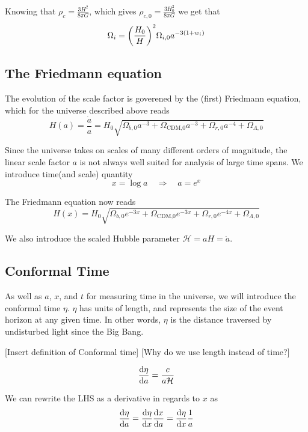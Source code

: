 \documentclass[a4paper]{article}
\renewcommand{\exp}{e^}
\renewcommand{\exp}{e^}
\begin{document}
Knowing that $\rho_c = \frac{3H^2}{8\pi G}$, which gives $\rho_{c,0} = \frac{3H_0^2}{8\pi G}$ we get that
\begin{align*}
    \Omega_{i} = \qty(\frac{H_0}{H})^2\Omega_{i,0}a^{-3(1+w_i)}
\end{align*}


\subsection{The Friedmann equation}
The evolution of the scale factor is goverened by the (first) Friedmann equation, which for the universe described above reads
\begin{equation}
    H(a) = \frac{\dot{a}}{a} = H_0\sqrt{\Omega_{b,0} a^{-3} + \Omega_\text{{CDM},0}a^{-3} + \Omega_{r,0}a^{-4} + \Omega_{\Lambda,0}}
\end{equation}

Since the universe takes on scales of many different orders of magnitude, the linear scale factor $a$ is not always well suited for analysis of large time spans. We introduce time(and scale) quantity
\begin{equation}
    x = \log{a} \quad \Rightarrow \quad a = \exp{x}
\end{equation}

The Friedmann equation now reads
\begin{equation}
    H(x) = H_0\sqrt{\Omega_{b,0} e^{-3x} + \Omega_\text{{CDM},0}e^{-3x} + \Omega_{r,0}e^{-4x} + \Omega_{\Lambda,0}}
\end{equation}

We also introduce the scaled Hubble parameter $\mathcal{H} = aH = \dot{a}$.


\subsection{Conformal Time}
As well as $a$, $x$, and $t$ for measuring time in the universe, we will introduce the conformal time $\eta$. $\eta$ has units of length, and represents the size of the event horizon at any given time. In other words, $\eta$ is the distance traversed by undisturbed light since the Big Bang.

[Insert definition of Conformal time]
[Why do we use length instead of time?]

\begin{align}\label{eqn:eta}
    \dv{\eta}{a} = \frac{c}{a\mathcal{H}}
\end{align}

We can rewrite the LHS as a derivative in regards to $x$ as
\begin{align*}
    \dv{\eta}{a} = \dv{\eta}{x}\dv{x}{a} = \dv{\eta}{x}\frac{1}{a}
\end{align*}
\end{document}
